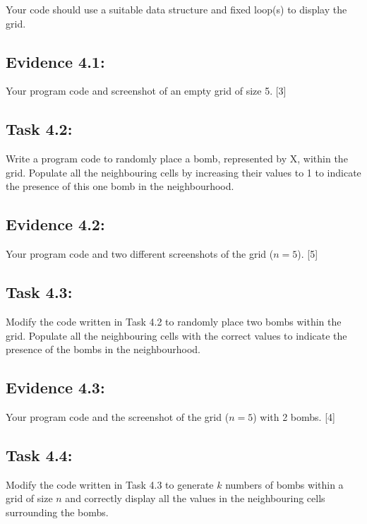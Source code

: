 Your code should use a suitable data structure and fixed loop(s) to
display the grid.

\subsection*{Evidence 4.1: }

Your program code and screenshot of an empty grid of size 5.\hfill{}
{[}3{]}


\subsection*{Task 4.2: }

Write a program code to randomly place a bomb, represented by \textquotedbl X\textquotedbl ,
within the grid. Populate all the neighbouring cells by increasing
their values to 1 to indicate the presence of this one bomb in the
neighbourhood. 

\subsection*{Evidence 4.2: }

Your program code and two different screenshots of the grid ($n=5$).
\hfill{}{[}5{]}

\subsection*{Task 4.3: }

Modify the code written in Task 4.2 to randomly place two bombs within
the grid. Populate all the neighbouring cells with the correct values
to indicate the presence of the bombs in the neighbourhood. 

\subsection*{Evidence 4.3: }

Your program code and the screenshot of the grid ($n=5$) with 2 bombs.\hfill{}
{[}4{]}

\subsection*{Task 4.4: }

Modify the code written in Task 4.3 to generate $k$ numbers of bombs
within a grid of size $n$ and correctly display all the values in
the neighbouring cells surrounding the bombs. 

